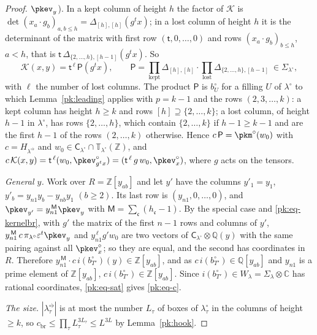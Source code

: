 \documentclass[10pt]{amsart}
\theoremstyle{definition}
\theoremstyle{remark}
\newcommand{\C}{\mathbb C}
\newcommand{\Z}{\mathbb Z}
\newcommand{\Q}{\mathbb Q}
\begin{document}
\begin{proof}
$\pkev_y$). In a kept column of height $h$ the factor of
$\mathcal K$ is $\det(x_a\cdot g_b)_{a,b\le h}=\Delta_{[h],[h]}(g^tx)$; in a lost column of height
$h$ it is the determinant of the matrix with first row $(\mathsf t,0,\dots,0)$ and rows
$(x_a\cdot g_b)_{b\le h}$, $a<h$, that is $\mathsf t\,\Delta_{\{2,\dots,h\},[h-1]}(g^tx)$. So
\[
\mathcal K(x,y)=\mathsf t^{\,\ell}\,\mathsf P(g^tx),\qquad\mathsf P=\prod_{\text{kept}}\Delta_{[h],[h]}
\cdot\prod_{\text{lost}}\Delta_{\{2,\dots,h\},[h-1]}\ \in\Sigma_{\lambda^\circ},
\]
with $\ell$ the number of lost columns. The product $\mathsf P$ is $b^\circ_U$ for a filling $U$
of $\lambda^\circ$ to which Lemma~\ref{pk:leading} applies with $p=k-1$ and the rows
$(2,3,\dots,k)$: a kept column has height $h\ge k$ and rows $[h]\supseteq\{2,\dots,k\}$; a lost
column, of height $h-1$ in $\lambda^\circ$, has rows $\{2,\dots,h\}$, which contain $\{2,\dots,k\}$
if $h-1\ge k-1$ and are the first $h-1$ of the rows $(2,\dots,k)$ otherwise. Hence $c\,\mathsf P=
\pkm^\circ(w_0)$ with $c=H_{\lambda^{\circ\flat}}$ and $w_0\in\mathsf C_{\lambda^\circ}\cap\mathbb
T_{\lambda^\circ}(\Z)$, and $c\,\mathcal K(x,y)=\mathsf t^{\,\ell}(w_0,\pkev^\circ_{g^tx})=(\mathsf
t^{\,\ell}\,g\,w_0,\pkev^\circ_x)$, where $g$ acts on the tensors.

\emph{General $y$.} Work over $R=\Z[y_{ab}]$ and let $y'$ have the columns $y'_1=y_1$,
$y'_b=y_{n1}y_b-y_{nb}y_1$ $(b\ge2)$. Its last row is $(y_{n1},0,\dots,0)$, and
$\pkev_{y'}=y_{n1}^{\,\mathsf M}\pkev_y$ with $\mathsf M=\sum_{\mathfrak c}(h_{\mathfrak c}-1)$. By
the special case and \eqref{pk:eq-kernelbr}, with $g'$ the matrix of the first $n-1$ rows and
columns of $y'$, $y_{n1}^{\,\mathsf M}\,c\,\pi_{\lambda^\circ}
\varepsilon^t\pkev_y$ and $y_{n1}^{\,\ell}g'w_0$ are two vectors of $\mathsf C_{\lambda^\circ}
\otimes\Q(y)$ with the same pairing against all $\pkev^\circ_x$; so they are equal, and the second
has coordinates in $R$. Therefore $y_{n1}^{\,\mathsf M}\cdot c\,i(b^\circ_{T'})(y)\in\Z[y_{ab}]$,
and as $c\,i(b^\circ_{T'})\in\Q[y_{ab}]$ and $y_{n1}$ is a prime element of $\Z[y_{ab}]$,
$c\,i(b^\circ_{T'})\in\Z[y_{ab}]$. Since $i(b^\circ_{T'})\in W_\lambda=\Sigma_\lambda\otimes\C$ has
rational coordinates, \eqref{pk:eq-sat} gives \eqref{pk:eq-c}.

\emph{The size.} $|\lambda^{\circ\flat}_\tau|$ is at most the number $L_\tau$ of boxes of
$\lambda^\circ_\tau$ in the columns of height $\ge k$, so $c_{\mathrm{br}}\le\prod_\tau
L_\tau^{3L_\tau}\le L^{3L}$ by Lemma~\ref{pk:hook}.
\end{proof}
\end{document}
